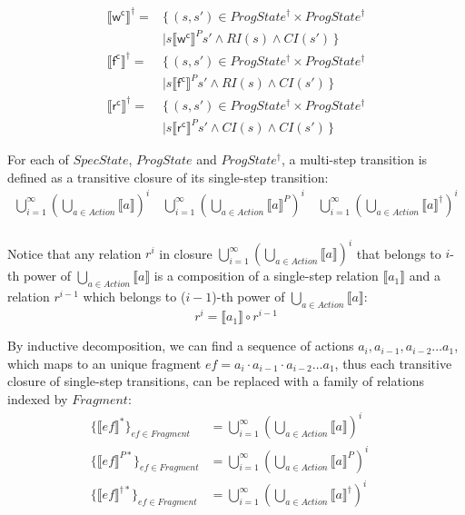 \documentclass[a4paper,11pt]{article}
\theoremstyle{definition}
\begin{document}
\begin{align*}
	\llbracket \mathsf {w^c} \rrbracket^\dagger ={}& \{\, (s, s') \in ProgState^\dagger \times ProgState^\dagger\\ &\mid s \llbracket \mathsf {w^c} \rrbracket^P s' \land \mathit{RI(s)} \land \mathit{CI(s')} \,\} \\
	\llbracket \mathsf {f^c} \rrbracket^\dagger ={}& \{\, (s, s') \in ProgState^\dagger \times ProgState^\dagger\\ &\mid s \llbracket \mathsf {f^c} \rrbracket^P s' \land \mathit{RI(s)} \land \mathit{CI(s')} \,\} \\
	\llbracket \mathsf {r^c} \rrbracket^\dagger ={}& \{\, (s, s') \in ProgState^\dagger \times ProgState^\dagger\\ &\mid s \llbracket \mathsf {r^c} \rrbracket^P s' \land \mathit{CI(s)} \land \mathit{CI(s')} \,\} 
\end{align*}

For each of $\mathit{SpecState}$, $\mathit{ProgState}$ and $\mathit{ProgState^\dagger}$, a multi-step transition is defined as a transitive closure of its single-step transition:
\begin{align*}
	\bigcup_{i=1}^\infty\left(\bigcup_{a \in Action} \llbracket a \rrbracket \right)^i \quad
	\bigcup_{i=1}^\infty\left(\bigcup_{a \in Action} \llbracket a \rrbracket^P \right)^i \quad
	\bigcup_{i=1}^\infty\left(\bigcup_{a \in Action} \llbracket a \rrbracket^\dagger \right)^i \\
\end{align*}

Notice that any relation $r^i$ in closure $\bigcup_{i=1}^\infty\left(\bigcup_{a \in Action} \llbracket a \rrbracket \right)^i$ that belongs to $i$-th power of $\bigcup_{a \in Action} \llbracket a \rrbracket$ is a composition of a single-step relation $\llbracket a_1 \rrbracket$ and a relation $r^{i-1}$ which belongs to (${i-1}$)-th power of $\bigcup_{a \in Action} \llbracket a \rrbracket$:
$$r^i = \llbracket a_1 \rrbracket \circ r^{i-1}$$

By inductive decomposition, we can find a sequence of actions $a_i, a_{i-1}, a_{i-2} \dots a_1$, which maps to an unique fragment $\mathit{ef} = a_i \cdot a_{i-1} \cdot a_{i-2} \dots a_1$, thus each transitive closure of single-step transitions, can be replaced with a family of relations indexed by $\mathit {Fragment}$:
\begin{align*}
	\{ \llbracket \mathit{ef} \rrbracket^* \}_\mathit{ef \in Fragment} &= 
	\bigcup_{i=1}^\infty\left(\bigcup_{a \in Action} \llbracket a \rrbracket \right)^i \quad\\
	\{ \llbracket \mathit{ef} \rrbracket^{P*} \}_\mathit{ef \in Fragment} &= 
	\bigcup_{i=1}^\infty\left(\bigcup_{a \in Action} \llbracket a \rrbracket^P \right)^i \quad\\
	\{ \llbracket \mathit{ef} \rrbracket^{\dagger*} \}_\mathit{ef \in Fragment} &= 
	\bigcup_{i=1}^\infty\left(\bigcup_{a \in Action} \llbracket a \rrbracket^\dagger \right)^i
\end{align*}
\end{document}
